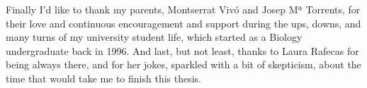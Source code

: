 Finally I'd like to thank my parents, Montserrat Vivó and Josep Mª Torrents, for their love and continuous encouragement and support during the ups, downs, and many turns of my university student life, which started as a Biology undergraduate back in 1996. And last, but not least, thanks to Laura Rafecas for being always there, and for her jokes, sparkled with a bit of skepticism, about the time that would take me to finish this thesis.

\newpage
